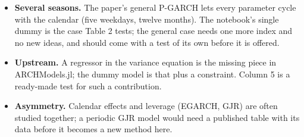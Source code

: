 \begin{itemize}
  \item \textbf{Several seasons.} The paper's general P-GARCH lets every parameter cycle with the calendar (five weekdays,
    twelve months). The notebook's single dummy is the case Table 2 tests; the general case needs one more index and no new
    ideas, and should come with a test of its own before it is offered.
  \item \textbf{Upstream.} A regressor in the variance equation is the missing piece in ARCHModels.jl; the dummy model
    is that plus a constraint. Column 5 is a ready-made test for such a contribution.
  \item \textbf{Asymmetry.} Calendar effects and leverage (EGARCH, GJR) are often studied together; a periodic GJR model
    would need a published table with its data before it becomes a new method here.
\end{itemize}

{\footnotesize
{}
}

\nmcredit

